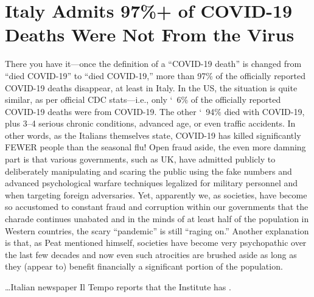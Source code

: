 \chapter{Italy Admits 97\%+ of COVID-19 Deaths Were Not From the Virus}

\begin{refsection}

There you have it---once the definition of a \enquote{COVID-19 death} is changed from \enquote{died  COVID-19} to \enquote{died  COVID-19,} more than 97\% of the officially reported COVID-19 deaths disappear, at least in Italy. In the US, the situation is quite similar, as per official CDC stats---i.e., only \char`~6\% of the officially reported COVID-19 deaths were from COVID-19. The other \char`~94\% died with COVID-19, plus 3--4 serious chronic conditions, advanced age, or even traffic accidents. In other words, as the Italians themselves state, COVID-19 has killed significantly FEWER people than the seasonal flu! Open fraud aside, the even more damning part is that various governments, such as UK, have admitted publicly to deliberately manipulating and scaring the public using the fake numbers and advanced psychological warfare techniques legalized  for military personnel and  when targeting foreign adversaries. Yet, apparently we, as societies, have become so accustomed to constant fraud and corruption within our governments that the charade continues unabated and in the minds of at least half of the population in Western countries, the scary \enquote{pandemic} is still \enquote{raging on.} Another explanation is that, as Peat mentioned himself, societies have become very psychopathic over the last few decades and now even such atrocities are brushed aside as long as they (appear to) benefit financially a significant portion of the population.

\begin{tcolorbox}[quote]

\dots{}Italian newspaper Il Tempo\textsuperscript{\cite{url783563ba}} reports that the Institute has .

\begin{quote}


\end{quote}
\end{tcolorbox}
\end{refsection}
